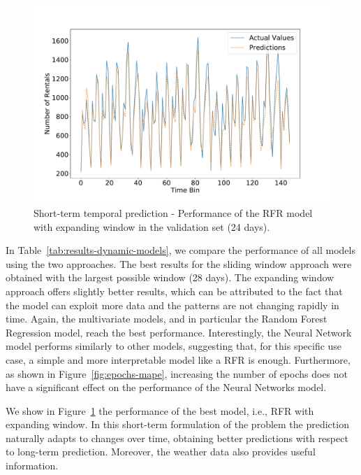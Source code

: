 \begin{figure}
    \begin{center}
            \includegraphics[width=0.65\columnwidth]{figures/temporal_analyses/RandomForestExpandingPredictions.pdf}
        \caption{Short-term temporal prediction - Performance of the RFR model with expanding window in the validation set (24 days).}
            \label{fig:random-forests-dynamic}

    \end{center}
\end{figure}


In Table~\ref{tab:results-dynamic-models}, we compare the performance of all models using the two approaches. The best results for the sliding window approach were obtained with the largest possible window (28 days). The expanding window approach offers slightly better results, which can be attributed to the fact that the model can exploit more data and the patterns are not changing rapidly in time. Again, the multivariate models, and in particular the Random Forest Regression model, reach the best performance. Interestingly, the Neural Network model performs similarly to other models, suggesting that, for this specific use case, a simple and more interpretable model like a RFR is enough.
Furthermore, as shown in Figure~\ref{fig:epochs-mape}, increasing the number of epochs does not have a significant effect on the performance of the Neural Networks model.

We show in Figure~\ref{fig:random-forests-dynamic} the performance of the best model, i.e., RFR with expanding window. In this short-term formulation of the problem the prediction naturally adapts to changes over time, obtaining better predictions with respect to long-term prediction. Moreover, the weather data also provides useful information. 



